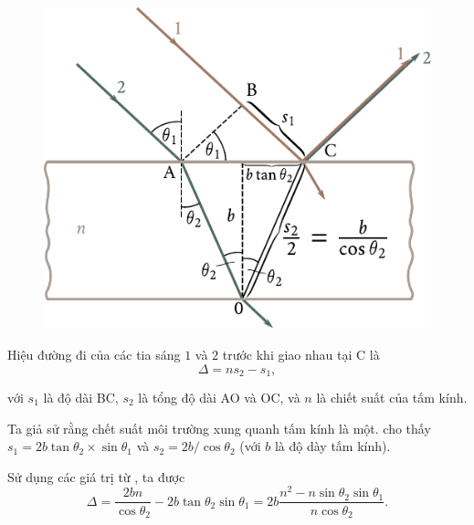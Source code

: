 \begin{figure}[!htb]
	\begin{center}
		\includegraphics[scale=0.95]{figures/ch_17/fig_17_10.pdf}
		\caption[]{}
		\label{fig:17_10}
	\end{center}
	\vspace{-0.8cm}
\end{figure}

Hiệu đường đi của các tia sáng $1$ và $2$ trước khi giao nhau tại C là
\begin{equation}\label{eq:17_32}
    \Delta = ns_2 - s_1,
\end{equation}

\noindent
với $s_1$ là độ dài BC, $s_2$ là tổng độ dài AO và OC, và $n$ là chiết suất của tấm kính.

Ta giả sử rằng chết suất môi trường xung quanh tấm kính là một.
 cho thấy $s_1 = 2b \tan\theta_2 \times \sin\theta_1$ và $s_2=2b/\cos\theta_2$ (với $b$ là độ dày tấm kính).

Sử dụng các giá trị từ , ta được
\begin{equation*}
    \Delta = \frac{2bn}{\cos\theta_2} - 2b\tan\theta_2\sin\theta_1 = 2b \frac{n^2 - n \sin\theta_2 \sin\theta_1}{n \cos\theta_2}.
\end{equation*}

